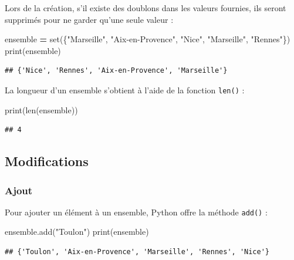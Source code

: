 \documentclass[12pt,]{book}
\newenvironment{Shaded}{\begin{snugshade}}{\end{snugshade}}
\newcommand{\StringTok}[1]{\textcolor[rgb]{0.31,0.60,0.02}{#1}}
\newcommand{\OperatorTok}[1]{\textcolor[rgb]{0.81,0.36,0.00}{\textbf{#1}}}
\newcommand{\BuiltInTok}[1]{#1}
\newcommand{\NormalTok}[1]{#1}
\numberwithin{equation}{section}
\numberwithin{countremarque}{section}
\begin{document}
Lors de la création, s'il existe des doublons dans les valeurs fournies,
ils seront supprimés pour ne garder qu'une seule valeur :

\begin{Shaded}
\begin{Highlighting}[]
\NormalTok{ensemble }\OperatorTok{=} \BuiltInTok{set}\NormalTok{(\{}\StringTok{"Marseille"}\NormalTok{, }\StringTok{"Aix-en-Provence"}\NormalTok{, }\StringTok{"Nice"}\NormalTok{, }\StringTok{"Marseille"}\NormalTok{, }\StringTok{"Rennes"}\NormalTok{\})}
\BuiltInTok{print}\NormalTok{(ensemble)}
\end{Highlighting}
\end{Shaded}

\begin{lstlisting}
## {'Nice', 'Rennes', 'Aix-en-Provence', 'Marseille'}
\end{lstlisting}

La longueur d'un ensemble s'obtient à l'aide de la fonction
\texttt{len()} :

\begin{Shaded}
\begin{Highlighting}[]
\BuiltInTok{print}\NormalTok{(}\BuiltInTok{len}\NormalTok{(ensemble))}
\end{Highlighting}
\end{Shaded}

\begin{lstlisting}
## 4
\end{lstlisting}

\subsection{Modifications}\label{modifications}

\subsubsection{Ajout}\label{ajout}

Pour ajouter un élément à un ensemble, Python offre la méthode
\texttt{add()} :

\begin{Shaded}
\begin{Highlighting}[]
\NormalTok{ensemble.add(}\StringTok{"Toulon"}\NormalTok{)}
\BuiltInTok{print}\NormalTok{(ensemble)}
\end{Highlighting}
\end{Shaded}

\begin{lstlisting}
## {'Toulon', 'Aix-en-Provence', 'Marseille', 'Rennes', 'Nice'}
\end{lstlisting}
\end{document}
